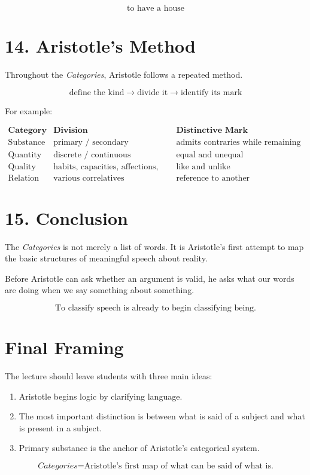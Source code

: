 \documentclass[12pt]{article}
\begin{document}
\[
\text{to have a house}
\]

\section*{14. Aristotle's Method}

Throughout the \textit{Categories}, Aristotle follows a repeated method.

\[
\boxed{
\text{define the kind} \rightarrow \text{divide it} \rightarrow \text{identify its mark}
}
\]

For example:

\[
\begin{array}{lll}
\textbf{Category} & \textbf{Division} & \textbf{Distinctive Mark} \\
\hline
\text{Substance} & \text{primary / secondary} &
\text{admits contraries while remaining one} \\
\text{Quantity} & \text{discrete / continuous} &
\text{equal and unequal} \\
\text{Quality} & \text{habits, capacities, affections, shape} &
\text{like and unlike} \\
\text{Relation} & \text{various correlatives} &
\text{reference to another}
\end{array}
\]

\section*{15. Conclusion}

The \textit{Categories} is not merely a list of words. It is Aristotle's first
attempt to map the basic structures of meaningful speech about reality.

Before Aristotle can ask whether an argument is valid, he asks what our words
are doing when we say something about something.

\[
\boxed{
\text{To classify speech is already to begin classifying being.}
}
\]

\section*{Final Framing}

The lecture should leave students with three main ideas:

\begin{enumerate}[itemsep=0.5em]
    \item Aristotle begins logic by clarifying language.
    \item The most important distinction is between what is said of a subject
    and what is present in a subject.
    \item Primary substance is the anchor of Aristotle's categorical system.
\end{enumerate}

\[
\boxed{
\textit{Categories} = \text{Aristotle's first map of what can be said of what is.}
}
\]
\end{document}
